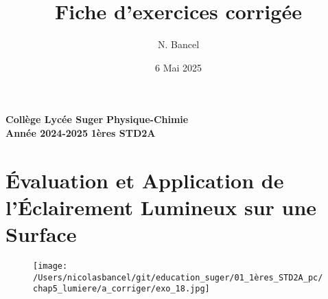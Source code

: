 \documentclass[answers]{exam}
\title{Fiche d'exercices corrigée}
\author{N. Bancel}
\date{6 Mai 2025}
\begin{document}
\textbf{Collège Lycée Suger}
\hfill
\textbf{Physique-Chimie} \\

\textbf{Année 2024-2025}
\hfill
\textbf{1ères STD2A} \par

{\let\newpage\relax\maketitle}




\section*{Évaluation et Application de l'Éclairement Lumineux sur une Surface}

    \begin{figure}[H]
      \centering
      \texttt{[image: /Users/nicolasbancel/git/education\_suger/01\_1ères\_STD2A\_pc/chap5\_lumiere/a\_corriger/exo\_18.jpg]}
      \captionsetup{labelformat=empty}
    \end{figure}
\end{document}
